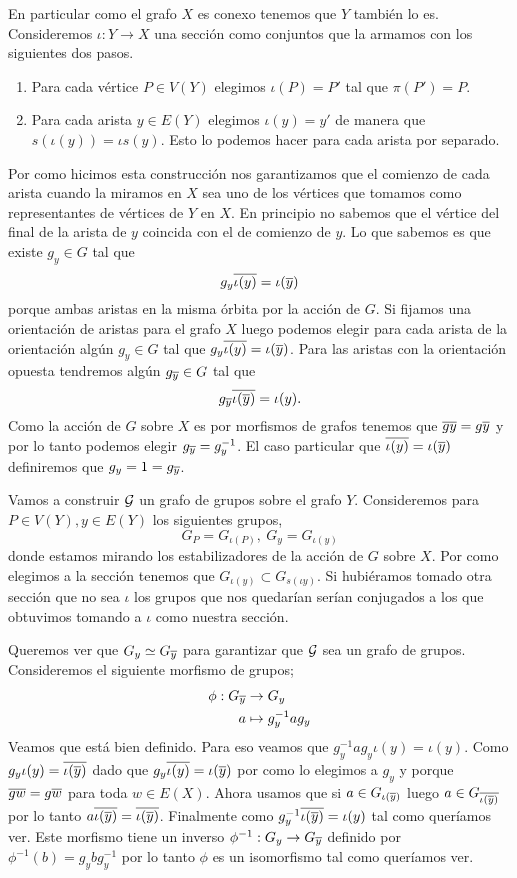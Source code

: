 \documentclass[tesis.tex]{subfiles}
\begin{document}
En particular como el grafo $X$ es conexo tenemos que $Y$ también lo es.
Consideremos $\iota: Y \to X$ una sección como conjuntos que la armamos con los siguientes dos pasos.
\begin{enumerate}
	\item Para cada vértice $P \in V(Y)$ elegimos $\iota (P) = P'$ tal que $\pi(P') = P$.
	\item Para cada arista $y \in E(Y)$ elegimos $\iota(y) = y'$ de manera que $s(\iota(y)) = \iota s(y)$. 
	Esto lo podemos hacer para cada arista por separado.
\end{enumerate}

Por como hicimos esta construcción nos garantizamos que el comienzo de cada arista cuando la miramos en $X$ sea uno de los vértices que tomamos como representantes de vértices de $Y$ en $X$.
En principio no sabemos que el vértice del final de la arista de $y$ coincida con el de comienzo de $y$. 
Lo que sabemos es que existe $g_y \in G$ tal que 
\[
	g_y \overline{\iota (y)} = \iota (\overline y)
\]
porque ambas aristas en la misma órbita por la acción de $G$.
Si fijamos una orientación de aristas para el grafo $X$ luego podemos elegir para cada arista de la orientación algún $g_y \in G$ tal que $g_y \overline{\iota (y)} = \iota (\overline y)$.
Para las aristas con la orientación opuesta tendremos algún $g_{\overline y} \in G$ tal que 
\[
	g_{\overline y} \overline{\iota(\overline y)} = \iota(y).
\]
Como la acción de $G$ sobre $X$ es por morfismos de grafos tenemos que $\overline {g y} = g \overline y$ y por lo tanto podemos elegir $g_{\overline y} = g_{y}^{-1}$.
El caso particular que $\overline{\iota (y)} = \iota (\overline y)$ definiremos que $g_y = 1 = g_{\overline y}$.

Vamos a construir ${\cal G}$ un grafo de grupos sobre el grafo $Y$.
Consideremos para $P \in V(Y), y \in E(Y)$ los siguientes grupos,
\[
	G_P = G_{\iota (P)}, \ G_y = G_{\iota(y)}
\]
donde estamos mirando los estabilizadores de la acción de $G$ sobre $X$.
Por como elegimos a la sección tenemos que $G_{\iota(y)} \subset G_{s(\iota y)}$. 
Si hubiéramos tomado otra sección que no sea $\iota$ los grupos que nos quedarían serían conjugados a los que obtuvimos tomando a $\iota$ como nuestra sección.

Queremos ver que $G_{y} \simeq G_{\overline y}$ para garantizar que ${\cal G}$ sea un grafo de grupos.
Consideremos el siguiente morfismo de grupos;
\begin{align*}
	\phi: G_{\overline y} &\to G_{y} \\
	a &\mapsto g_{y}^{-1}ag_{y}
\end{align*}
Veamos que está bien definido. 
Para eso veamos que $g_{y}^{-1}ag_{y} \iota(y) = \iota(y)$.
Como $g_y \iota(y) = \overline{\iota(\overline y)}$ dado que $g_y \overline{\iota(y)} = \iota (\overline y)$ por como lo elegimos a $g_y$ y porque $\overline{gw} = g \overline w$ para toda $w \in E(X)$.
Ahora usamos que si $a \in G_{\iota({\overline y})}$ luego $a \in G_{\overline{\iota(\overline y)}}$ por lo tanto $a \overline{\iota(\overline y)} = \overline{\iota(\overline y)} $.
Finalmente como $ g_{y}^{-1} \overline {\iota (\overline y) } = \iota (y)$ tal como queríamos ver.
Este morfismo tiene un inverso $\phi^{-1}: G_{y} \to G_{\overline y}$ definido por $\phi^{-1}(b) = g_{y}bg_{y}^{-1}$ por lo tanto $\phi$ es un isomorfismo tal como queríamos ver.
\end{document}

